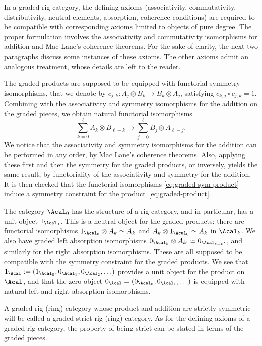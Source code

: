In a graded rig category, the defining axioms (associativity, commutativity, distributivity, neutral elements, absorption, coherence conditions) are required to be compatible with corresponding axioms limited to objects of pure degree. The proper formulation involves the associativity and commutativity isomorphisms for addition and Mac Lane's coherence theorems. For the sake of clarity, the next two paragraphs discuss some instances of these axioms. The other axioms admit an analogous treatment, whose details are left to the reader.

The graded products are supposed to be equipped with functorial symmetry isomorphisms, that we denote by $c_{j,k}\colon A_{j}\otimes B_{k}\to B_{k}\otimes A_{j}$, satisfying $c_{k,j}\circ c_{j,k}=1$. Combining with the associativity and symmetry isomorphisms for the addition on the graded pieces, we obtain natural functorial isomorphisms
\begin{equation}\label{eq:graded-sym-product}
\sum_{k=0}^{\ell}A_{k}\otimes B_{\ell-k}\to\sum_{j=0}^{\ell}B_{j}\otimes A_{\ell-j}.
\end{equation}
We notice that the associativity and symmetry isomorphisms for the addition can be performed in any order, by Mac Lane's coherence theorems. Also, applying these first and then the symmetry for the graded products, or inversely, yields the same result, by functoriality of the associativity and symmetry for the addition. It is then checked that the functorial isomorphisms \eqref{eq:graded-sym-product} induce a symmetry constraint for the product~\eqref{eq:graded-product}.

The category $\Acal_{0}$ has the structure of a rig category, and in particular, has a unit object $1_{\Acal_{0}}$. This is a neutral object for the graded products: there are functorial isomorphisms $1_{\Acal_{0}}\otimes A_{k}\simeq A_{k}$ and $A_{k}\otimes 1_{\Acal_{0}}\simeq A_{k}$ in $\Acal_{k}$. We also have graded left absorption isomorphisms $0_{\Acal_{k}}\otimes A_{k'}\simeq 0_{\Acal_{k+k'}}$, and similarly for the right absorption isomorphisms. These are all supposed to be compatible with the symmetry constraint for the graded products. We see that $1_{\Acal}:=(1_{\Acal_{0}},0_{\Acal_{1}},0_{\Acal_{2}},\ldots )$ provides a unit object for the product on $\Acal$, and that the zero object $0_{\Acal}=(0_{\Acal_{0}},0_{\Acal_{1}},\ldots)$ is equipped with natural left and right absorption isomorphisms.

A graded rig (\resp ring) category whose product and addition are strictly symmetric will be called a graded strict rig (\resp ring) category. As for the defining axioms of a graded rig category, the property of being strict can be stated in terms of the graded pieces.

